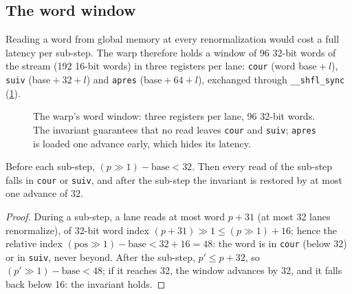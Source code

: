 \subsection{The word window}

Reading a word from global memory at every renormalization would cost a full latency per sub-step. The warp therefore holds a window of 96 32-bit words of the stream (192 16-bit words) in three registers per lane: \texttt{cour} (word base${}+l$), \texttt{suiv} (base${}+32+l$) and \texttt{apres} (base${}+64+l$), exchanged through \texttt{\_\_shfl\_sync} (\cref{fig:t2n-fenetre}).

\begin{figure}[!htbp]
\centering
\SchemaNoyFenetreMots
\caption[The three-register word window]{The warp's word window: three registers per lane, 96 32-bit words. The invariant guarantees that no read leaves \texttt{cour} and \texttt{suiv}; \texttt{apres} is loaded one advance early, which hides its latency.}
\label{fig:t2n-fenetre}
\end{figure}

\begin{lemme}\label{lem:t2n-fenetre}
Before each sub-step, $(p \gg 1) - \mathrm{base} < 32$. Then every read of the sub-step falls in \texttt{cour} or \texttt{suiv}, and after the sub-step the invariant is restored by at most one advance of 32.
\end{lemme}

\begin{proof}
During a sub-step, a lane reads at most word $p + 31$ (at most 32 lanes renormalize), of 32-bit word index $(p + 31) \gg 1 \le (p \gg 1) + 16$; hence the relative index $(\mathrm{pos} \gg 1) - \mathrm{base} < 32 + 16 = 48$: the word is in \texttt{cour} (below 32) or in \texttt{suiv}, never beyond. After the sub-step, $p' \le p + 32$, so $(p' \gg 1) - \mathrm{base} < 48$; if it reaches 32, the window advances by 32, and it falls back below 16: the invariant holds.
\end{proof}

